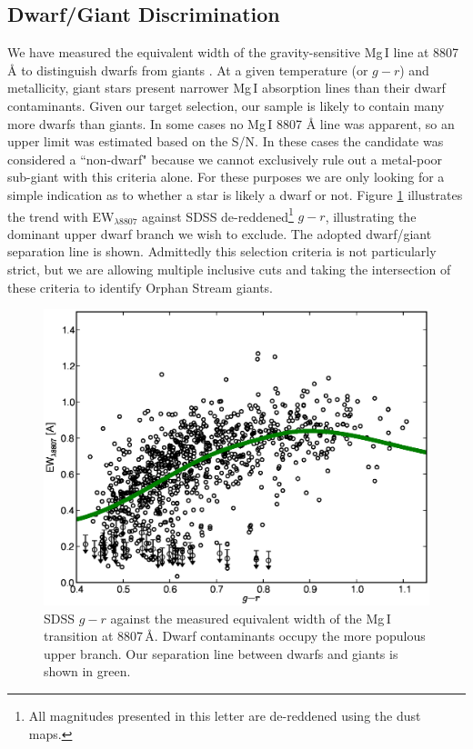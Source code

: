 \documentclass[10pt,apjl]{emulateapj}
\begin{document}
\subsection{Dwarf/Giant Discrimination}
\label{sec:dwarf-giant}

We have measured the equivalent width of the gravity-sensitive Mg\,\textsc{I} line at 8807 \AA{} to distinguish dwarfs from giants \citep{Battaglia_Starkenburg_2012}. At a given temperature (or $g - r$) and metallicity, giant stars present narrower Mg\,\textsc{I} absorption lines than their dwarf contaminants. Given our target selection, our sample is likely to contain many more dwarfs than giants. In some cases no Mg\,\textsc{I} 8807 \AA{} line was apparent, so an upper limit was estimated based on the S/N. In these cases the candidate was considered a ``non-dwarf" because we cannot exclusively rule out a metal-poor sub-giant with this criteria alone. For these purposes we are only looking for a simple indication as to whether a star is likely a dwarf or not. Figure \ref{fig:ew-mg} illustrates the trend with EW$_{\lambda8807}$ against SDSS de-reddened\footnote{All magnitudes presented in this letter are de-reddened using the \citet{Schlegel_Finkbeiner_Davis_1998} dust maps.} $g - r$, illustrating the dominant upper dwarf branch we wish to exclude. The adopted dwarf/giant separation line is shown. Admittedly this selection criteria is not particularly strict, but we are allowing multiple inclusive cuts and taking the intersection of these criteria to identify Orphan Stream giants.

\begin{figure}[h]
	\includegraphics[width=\columnwidth]{./fig2.eps}
	\caption{SDSS $g - r$ against the measured equivalent width of the Mg\,\textsc{I} transition at 8807\,\AA{}. Dwarf contaminants occupy the more populous upper branch. Our separation line between dwarfs and giants is shown in green.}
	\label{fig:ew-mg}
\end{figure}
\end{document}
